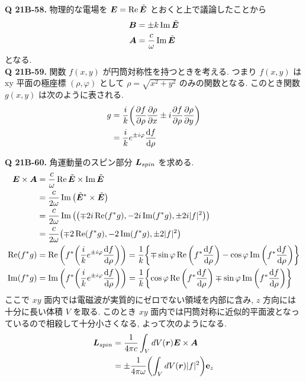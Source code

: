 \documentclass[uplatex,dvipdfmx,a4paper,11pt]{jlreq}
\newcommand{\EE}{\bm{E}}
\newcommand{\BB}{\bm{B}}
\renewcommand{\AA}{\bm{A}}
\newcommand{\rr}{\bm{r}}
\theoremstyle{definition}
\begin{document}
\textbf{Q 21B-58.}
物理的な電場を $\EE = \Re\ET$ とおくと上で議論したことから
\begin{align}
  \BB & = \pm k\Im\ET \label{B tilde E} \\
  \AA & = \frac{c}{\omega}\Im\ET
\end{align}
となる. \\

\textbf{Q 21B-59.}
関数 $f(x,y)$ が円筒対称性を持つときを考える. つまり $f(x,y)$ は xy 平面の極座標 $(\rho, \varphi)$ として $\rho=\sqrt{x^2 + y^2}$ のみの関数となる. このとき関数 $g(x,y)$ は次のように表される.
\begin{align}
  g & = \frac{i}{k}\qty(\pdv{f}{\rho}\pdv{\rho}{x}\pm i\pdv{f}{\rho}\pdv{\rho}{y}) \\
    & = \frac{i}{k}e^{\pm i\varphi}\dv{f}{\rho} \label{def g}
\end{align}

\textbf{Q 21B-60.}
角運動量のスピン部分 $\bm{L}_{spin}$ を求める.
\begin{align}
  \EE \times \AA & = \frac{c}{\omega}\Re\ET\times\Im\ET                                                                                                                        \\
                 & = \frac{c}{2\omega}\Im\qty(\ET^*\times\ET)                                                                                                                  \\
                 & = \frac{c}{2\omega}\Im\qty(\qty(\mp 2i\Re(f^*g), -2i\Im(f^*g), \pm 2i|f|^2))                                                                                \\
                 & = \frac{c}{2\omega}\qty(\mp 2\Re(f^*g), -2\Im(f^*g), \pm 2|f|^2)                                                                                            \\
  \Re(f^*g)      & = \Re\qty(f^*\qty(\frac{i}{k}e^{\pm i\varphi}\dv{f}{\rho})) = \frac{1}{k}\qty{\mp\sin\varphi\Re\qty(f^*\dv{f}{\rho}) - \cos\varphi\Im\qty(f^*\dv{f}{\rho})} \\
  \Im(f^*g)      & = \Im\qty(f^*\qty(\frac{i}{k}e^{\pm i\varphi}\dv{f}{\rho})) = \frac{1}{k}\qty{\cos\varphi\Re\qty(f^*\dv{f}{\rho}) \mp \sin\varphi\Im\qty(f^*\dv{f}{\rho})}
\end{align}
ここで $xy$ 面内では電磁波が実質的にゼロでない領域を内部に含み, $z$ 方向には十分に長い体積 $V$ を取る. このとき $xy$ 面内では円筒対称に近似的平面波となっているので相殺して十分小さくなる, よって次のようになる.
\begin{align}
  \LL_{spin} & = \frac{1}{4\pi c}\int_V dV(\rr)\EE\times\AA               \\
             & = \pm\frac{1}{4\pi\omega}\qty(\int_V dV(\rr)|f|^2)\vb{e}_z
\end{align}
\end{document}
